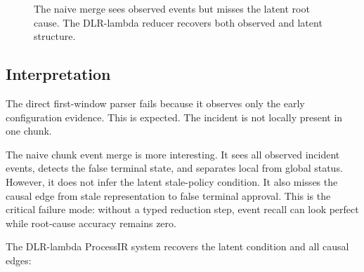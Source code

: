 \documentclass[11pt]{article}
\begin{document}
\begin{figure}[h]
\centering
{}
\caption{The naive merge sees observed events but misses the latent root cause.
The DLR-lambda reducer recovers both observed and latent structure.}
\end{figure}

\subsection{Interpretation}

The direct first-window parser fails because it observes only the early
configuration evidence. This is expected. The incident is not locally present in
one chunk.

The naive chunk event merge is more interesting. It sees all observed incident
events, detects the false terminal state, and separates local from global
status. However, it does not infer the latent stale-policy condition. It also
misses the causal edge from stale representation to false terminal approval.
This is the critical failure mode: without a typed reduction step, event recall
can look perfect while root-cause accuracy remains zero.

The DLR-lambda ProcessIR system recovers the latent condition and all causal
edges:
\end{document}
